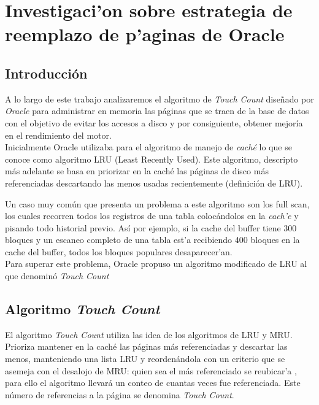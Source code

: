 \documentclass[11pt, a4paper, spanish]{article}
\newenvironment{borde}[1]
{\begin{lrbox}{\fmbox}\begin{minipage}{#1}}
{\end{minipage}\end{lrbox}\fbox{\usebox{\fmbox}}\\[10pt]}
\begin{document}


\newpage 
\section{Investigaci'on sobre estrategia de reemplazo de p'aginas de Oracle}

\subsection{Introducci\'on}

A lo largo de este trabajo analizaremos el algoritmo de \textit{Touch Count} dise\~{n}ado por \textit{Oracle} para administrar en memoria las p\'aginas que se
traen de la base de datos con el objetivo de evitar los accesos a disco y por consiguiente, obtener mejor\'ia en el rendimiento del motor.\\

Inicialmente Oracle utilizaba para el algoritmo de manejo de \textit{cach\'e} lo que se conoce como algoritmo LRU (Least Recently Used). Este algoritmo, 
descripto m\'as adelante se basa en priorizar en la cach\'e las p\'aginas de disco m\'as referenciadas descartando las menos usadas recientemente 
(definici\'on de LRU).

Un caso muy com\'un que presenta un problema a este algoritmo son los full scan, los cuales recorren todos los registros de una tabla coloc\'andolos en 
la \textit{cach'e} y pisando todo historial previo. As\'i por ejemplo, si la cache del buffer tiene 300 bloques y un escaneo completo de una 
tabla est'a recibiendo 400 bloques en la cache del buffer, todos los bloques populares desaparecer'an. \\

Para superar este problema, Oracle propuso un algoritmo modificado de LRU al que denomin\'o \textit{Touch Count}
  
\subsection{Algoritmo \textit{Touch Count}}

El algoritmo \textit{Touch Count} utiliza las idea de los algoritmos de LRU y MRU. Prioriza mantener en la cach\'e las p\'aginas m\'as referenciadas y descartar las menos, manteniendo una lista LRU y reorden\'andola con un criterio que se asemeja con el desalojo de MRU: quien sea el m\'as referenciado se reubicar'a , para ello el algoritmo llevar\'a un conteo de cuantas veces fue referenciada. Este n\'umero
de referencias a la p\'agina se denomina \textit{Touch Count}.
\end{document}
